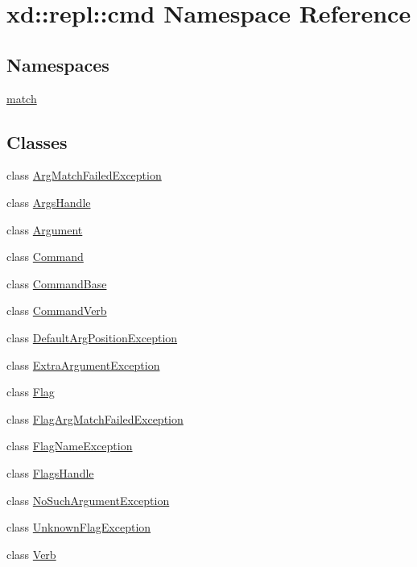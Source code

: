 \hypertarget{namespacexd_1_1repl_1_1cmd}{}\section{xd\+:\+:repl\+:\+:cmd Namespace Reference}
\label{namespacexd_1_1repl_1_1cmd}
\subsection*{Namespaces}
\begin{DoxyCompactItemize}
\item 
 \mbox{\hyperlink{namespacexd_1_1repl_1_1cmd_1_1match}{match}}
\end{DoxyCompactItemize}
\subsection*{Classes}
\begin{DoxyCompactItemize}
\item 
class \mbox{\hyperlink{classxd_1_1repl_1_1cmd_1_1_arg_match_failed_exception}{Arg\+Match\+Failed\+Exception}}
\item 
class \mbox{\hyperlink{classxd_1_1repl_1_1cmd_1_1_args_handle}{Args\+Handle}}
\item 
class \mbox{\hyperlink{classxd_1_1repl_1_1cmd_1_1_argument}{Argument}}
\item 
class \mbox{\hyperlink{classxd_1_1repl_1_1cmd_1_1_command}{Command}}
\item 
class \mbox{\hyperlink{classxd_1_1repl_1_1cmd_1_1_command_base}{Command\+Base}}
\item 
class \mbox{\hyperlink{classxd_1_1repl_1_1cmd_1_1_command_verb}{Command\+Verb}}
\item 
class \mbox{\hyperlink{classxd_1_1repl_1_1cmd_1_1_default_arg_position_exception}{Default\+Arg\+Position\+Exception}}
\item 
class \mbox{\hyperlink{classxd_1_1repl_1_1cmd_1_1_extra_argument_exception}{Extra\+Argument\+Exception}}
\item 
class \mbox{\hyperlink{classxd_1_1repl_1_1cmd_1_1_flag}{Flag}}
\item 
class \mbox{\hyperlink{classxd_1_1repl_1_1cmd_1_1_flag_arg_match_failed_exception}{Flag\+Arg\+Match\+Failed\+Exception}}
\item 
class \mbox{\hyperlink{classxd_1_1repl_1_1cmd_1_1_flag_name_exception}{Flag\+Name\+Exception}}
\item 
class \mbox{\hyperlink{classxd_1_1repl_1_1cmd_1_1_flags_handle}{Flags\+Handle}}
\item 
class \mbox{\hyperlink{classxd_1_1repl_1_1cmd_1_1_no_such_argument_exception}{No\+Such\+Argument\+Exception}}
\item 
class \mbox{\hyperlink{classxd_1_1repl_1_1cmd_1_1_unknown_flag_exception}{Unknown\+Flag\+Exception}}
\item 
class \mbox{\hyperlink{classxd_1_1repl_1_1cmd_1_1_verb}{Verb}}
\end{DoxyCompactItemize}
